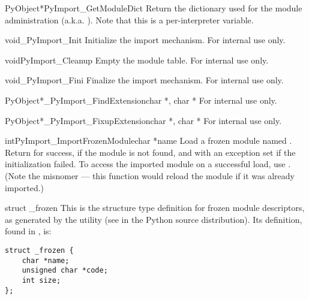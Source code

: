 \documentclass{manual}
\begin{document}
\begin{cfuncdesc}{PyObject*}{PyImport_GetModuleDict}{}
Return the dictionary used for the module administration
(a.k.a. ).  Note that this is a per-interpreter
variable.
\end{cfuncdesc}

\begin{cfuncdesc}{void}{_PyImport_Init}{}
Initialize the import mechanism.  For internal use only.
\end{cfuncdesc}

\begin{cfuncdesc}{void}{PyImport_Cleanup}{}
Empty the module table.  For internal use only.
\end{cfuncdesc}

\begin{cfuncdesc}{void}{_PyImport_Fini}{}
Finalize the import mechanism.  For internal use only.
\end{cfuncdesc}

\begin{cfuncdesc}{PyObject*}{_PyImport_FindExtension}{char *, char *}
For internal use only.
\end{cfuncdesc}

\begin{cfuncdesc}{PyObject*}{_PyImport_FixupExtension}{char *, char *}
For internal use only.
\end{cfuncdesc}

\begin{cfuncdesc}{int}{PyImport_ImportFrozenModule}{char *name}
Load a frozen module named .  Return  for success,
 if the module is not found, and  with an exception
set if the initialization failed.  To access the imported module on a
successful load, use .
(Note the misnomer --- this function would reload the module if it was
already imported.)
\end{cfuncdesc}

\begin{ctypedesc}[_frozen]{struct _frozen}
This is the structure type definition for frozen module descriptors,
as generated by the  utility
(see  in the Python source distribution).  Its
definition, found in , is:

\begin{verbatim}
struct _frozen {
    char *name;
    unsigned char *code;
    int size;
};
\end{verbatim}
\end{ctypedesc}
\end{document}
